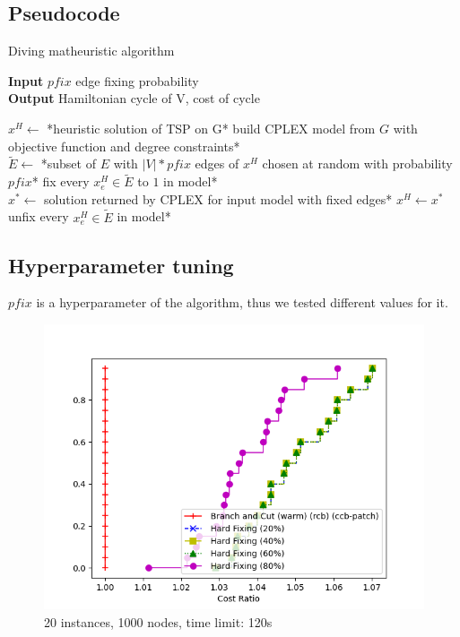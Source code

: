 \subsection{Pseudocode}
\begin{algorithm}[h]
    \caption{Diving matheuristic algorithm}
    \hspace*{\algorithmicindent} \textbf{Input} $pfix$ edge fixing probability\\
    \hspace*{\algorithmicindent} \textbf{Output} Hamiltonian cycle of V, cost of cycle\\
    \begin{algorithmic}

        \State $x^H \gets$ *heuristic solution of TSP on G*
        \State *build CPLEX model from $G$ with objective function and degree constraints*\\
        \State $\tilde{E} \gets$ *subset of $E$ with $|V|*pfix$ edges of $x^H$ chosen at random with probability $pfix$*
        \State *fix every $x_e^H\in\tilde{E}$ to $1$ in model*\\
        \State *$x^*\gets$ solution returned by CPLEX for input model with fixed edges*
        \State $x^H\gets x^*$
        \EndIf\\
        \State *unfix every $x_e^H\in\tilde{E}$ in model*
        \EndWhile

    \end{algorithmic}
\end{algorithm}
\FloatBarrier

\subsection{Hyperparameter tuning}

$pfix$ is a hyperparameter of the algorithm, thus we tested different values for it.

\begin{figure}[h]
    \centering
    \includegraphics*[width=.6\textwidth]{../plots/perfprof_hard_costs.png}
    \caption*{20 instances, 1000 nodes, time limit: 120s}
\end{figure}
\FloatBarrier

